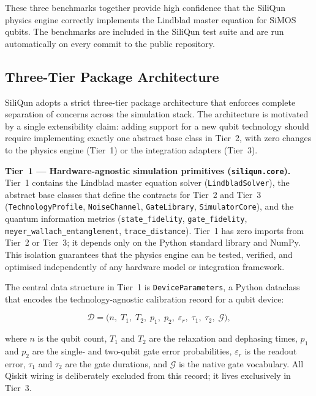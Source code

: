 These three benchmarks together provide high confidence that the SiliQun physics engine correctly implements the Lindblad master equation for SiMOS qubits. The benchmarks are included in the SiliQun test suite and are run automatically on every commit to the public repository.

\subsection{Three-Tier Package Architecture}
\label{subsec:three_tier}

SiliQun adopts a strict three-tier package architecture that enforces
complete separation of concerns across the simulation stack.
The architecture is motivated by a single extensibility claim: adding
support for a new qubit technology should require implementing exactly
one abstract base class in Tier~2, with zero changes to the physics
engine (Tier~1) or the integration adapters (Tier~3).

\textbf{Tier~1 — Hardware-agnostic simulation primitives
(\texttt{siliqun.core}).}
Tier~1 contains the Lindblad master equation solver
(\texttt{LindbladSolver}), the abstract base classes that define the
contracts for Tier~2 and Tier~3 (\texttt{TechnologyProfile},
\texttt{NoiseChannel}, \texttt{GateLibrary}, \texttt{SimulatorCore}),
and the quantum information metrics (\texttt{state\_fidelity},
\texttt{gate\_fidelity}, \texttt{meyer\_wallach\_entanglement},
\texttt{trace\_distance}).
Tier~1 has zero imports from Tier~2 or Tier~3; it depends only on
the Python standard library and NumPy.
This isolation guarantees that the physics engine can be tested,
verified, and optimised independently of any hardware model or
integration framework.

The central data structure in Tier~1 is \texttt{DeviceParameters}, a
Python dataclass that encodes the technology-agnostic calibration record
for a qubit device:

\begin{equation}
  \mathcal{D} = \bigl(n,\; T_1,\; T_2,\; p_1,\; p_2,\;
  \varepsilon_r,\; \tau_1,\; \tau_2,\; \mathcal{G}\bigr),
  \label{eq:device_params}
\end{equation}

where $n$ is the qubit count, $T_1$ and $T_2$ are the relaxation and
dephasing times, $p_1$ and $p_2$ are the single- and two-qubit gate
error probabilities, $\varepsilon_r$ is the readout error, $\tau_1$ and
$\tau_2$ are the gate durations, and $\mathcal{G}$ is the native gate
vocabulary.
All Qiskit wiring is deliberately excluded from this record; it lives
exclusively in Tier~3.

